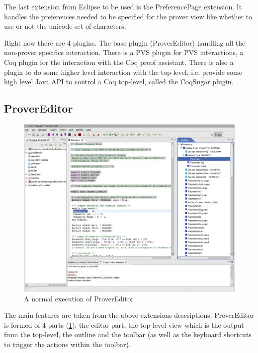 \documentclass{llncs}
\begin{document}
The last extension from Eclipse to be used is the PreferencePage extension.
It handles the preferences needed to be specified for the prover view
like whether to use or not the unicode set of characters.


Right now there are 4 plugins. The base plugin (ProverEditor)
handling all the non-prover specifics interaction. There is a PVS plugin for
PVS interactions, a Coq plugin for the interaction with the Coq proof 
assistant. There is also a plugin to do some higher level interaction 
with the top-level, i.e. provide some high level Java API to control 
a Coq top-level, called the CoqSugar plugin. 

\subsection{ProverEditor}
\label{subsec:provereditor}
\begin{figure}
\begin{center}
\includegraphics[width=\linewidth]{screenshot1}
\end{center}
  \caption{A normal execution of ProverEditor}
  \label{scrs1}
\end{figure}
The main features are taken from the above extensions descriptions.
ProverEditor is formed of 4 parts 
(\ref{scrs1}): the editor part, the top-level view which is the output 
from the top-level, the outline and the toolbar (as well as the keyboard 
shortcuts to trigger the actions within the toolbar).
\end{document}
